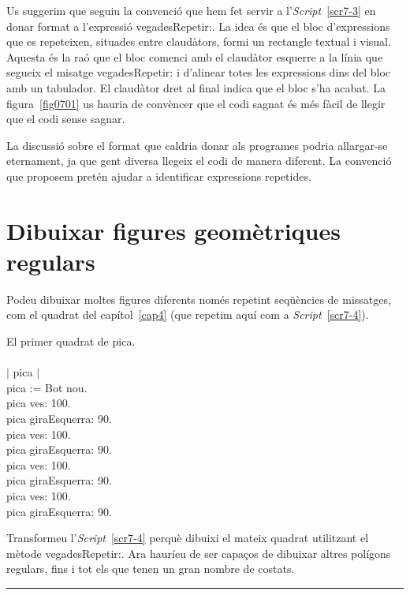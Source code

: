 Us suggerim que seguiu la convenció que hem fet servir a l'\emph{Script}~\ref{scr7-3} en donar format a \mbox{l'expressió} \textsf{vegadesRepetir:}. La idea és que el bloc d'expressions que es repeteixen, situades entre claudàtors, formi un rectangle textual i visual. Aquesta és la raó que el bloc comenci amb el claudàtor esquerre a la línia que segueix el misatge \textsf{vegadesRepetir:} i d'alinear 
totes les expressions dins del bloc amb un tabulador. El claudàtor dret al final indica que el bloc s'ha acabat. La figura~\ref{fig0701} us hauria de convèncer que el codi sagnat és més fàcil de llegir que el codi sense sagnar. 

La discussió sobre el format que caldria donar als programes podria allargar-se eternament, ja que gent diversa llegeix el codi de manera diferent. La convenció que proposem pretén ajudar a identificar expressions repetides.

\section{Dibuixar figures geomètriques regulars}
Podeu dibuixar moltes figures diferents només repetint seqüències de missatges, com el quadrat del capítol~\ref{cap4} (que repetim aquí com a \emph{Script}~\ref{scr7-4}).
\begin{script}  El primer quadrat de pica.
\textsf{\upshape
\\
\\$|$ pica $|$\\
pica := Bot nou.\\
pica ves: 100.\\
pica giraEsquerra: 90.\\
pica ves: 100.\\
pica giraEsquerra: 90.\\
pica ves: 100.\\
pica giraEsquerra: 90.\\
pica ves: 100.\\
pica giraEsquerra: 90.\\
}
\label{scr7-4}
\end{script}

\begin{center}
\colorbox{black}{}
\end{center}
{\small
\noindent
Transformeu l'\emph{Script}~\ref{scr7-4} perquè dibuixi el mateix quadrat utilitzant el mètode \textsf{vegadesRepetir:}. Ara hauríeu de ser capaços de dibuixar altres polígons regulars, fins i tot els que tenen un gran nombre de costats.}\\
\noindent
\rule{\textwidth}{3pt}

